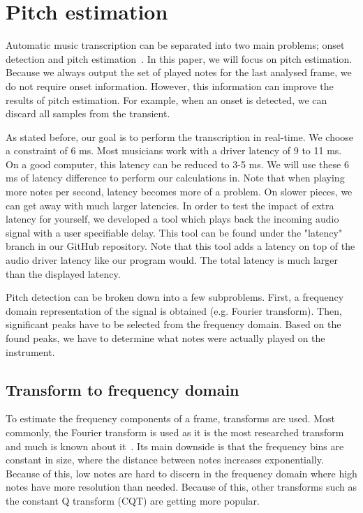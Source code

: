 \documentclass[10pt,twocolumn]{article}
\begin{document}
\section{Pitch estimation}
Automatic music transcription can be separated into two main problems; onset detection and pitch estimation~\cite{survey2}. In this paper, we will focus on pitch estimation. Because we always output the set of played notes for the last analysed frame, we do not require onset information. However, this information can improve the results of pitch estimation. For example, when an onset is detected, we can discard all samples from the transient.

As stated before, our goal is to perform the transcription in real-time. We choose a constraint of 6 ms. Most musicians work with a driver latency of 9 to 11 ms. On a good computer, this latency can be reduced to 3-5 ms. We will use these 6 ms of latency difference to perform our calculations in. Note that when playing more notes per second, latency becomes more of a problem. On slower pieces, we can get away with much larger latencies. In order to test the impact of extra latency for yourself, we developed a tool which plays back the incoming audio signal with a user specifiable delay. This tool can be found under the "latency" branch in our GitHub repository. Note that this tool adds a latency on top of the audio driver latency like our program would. The total latency is much larger than the displayed latency.

Pitch detection can be broken down into a few subproblems. First, a frequency domain representation of the signal is obtained (e.g. Fourier transform). Then, significant peaks have to be selected from the frequency domain. Based on the found peaks, we have to determine what notes were actually played on the instrument.

\subsection{Transform to frequency domain}
To estimate the frequency components of a frame, transforms are used. Most commonly, the Fourier transform is used as it is the most researched transform and much is known about it~\cite{survey2}. Its main downside is that the frequency bins are constant in size, where the distance between notes increases exponentially. Because of this, low notes are hard to discern in the frequency domain where high notes have more resolution than needed. Because of this, other transforms such as the constant Q transform (CQT) are getting more popular.
\end{document}
